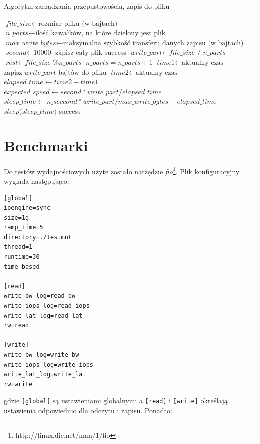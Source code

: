  \begin{algorithm}
 \caption{Algorytm zarządzania przepustowością, zapis do pliku}\label{writealg}
 \begin{algorithmic}[1]
  \STATE $\textit{file\_size} \gets \text{rozmiar pliku (w bajtach)}$
  \STATE $\textit{n\_parts} \gets \text{ilość kawałków, na które dzielony jest plik}$
  \STATE $\textit{max\_write\_bytes} \gets \text{maksymalna szybkość transferu danych zapisu (w bajtach)}$ 
  \STATE $\textit{second} \gets \textit{10000}$
    \STATE $\text{zapisz cały plik}$
    \RETURN success
  \ENDIF
  \STATE $\textit{write\_part} \gets \textit{file\_size / n\_parts}$
  \STATE $\textit{rest} \gets \textit{file\_size \% n\_parts}$
    \STATE $\textit{n\_parts} = \textit{n\_parts} + 1$
  \ENDIF
    \STATE $\textit{time1} \gets \text{aktualny czas}$
    \STATE $\text{zapisz } \textit{write\_part} \text{ bajtów do pliku}$
    \STATE $\textit{time2} \gets \text{aktualny czas}$
    \STATE $\textit{elapsed\_time} \gets \textit{time2} - \textit{time1}$
    \STATE $\textit{expected\_speed} \gets \textit{second} * \textit{write\_part} / \textit{elapsed\_time}$
    \STATE $\textit{sleep\_time} \gets \textit{n\_seccond} * \textit{write\_part} / \textit{max\_write\_bytes} - \textit{elapsed\_time}$
    \STATE $\textit{sleep(sleep\_time)}$
    \ENDIF
  \ENDFOR
  \RETURN success

 \end{algorithmic}
 \end{algorithm}

\clearpage
\section{Benchmarki}

Do testów wydajnościowych użyte zostało narzędzie \textit{fio}\footnote{http://linux.die.net/man/1/fio}.
Plik konfiguracyjny wygląda następująco:

\begin{verbatim}
[global]
ioengine=sync
size=1g
ramp_time=5
directory=./testmnt
thread=1
runtime=30
time_based

[read]
write_bw_log=read_bw
write_iops_log=read_iops
write_lat_log=read_lat
rw=read

[write]
write_bw_log=write_bw
write_iops_log=write_iops
write_lat_log=write_lat
rw=write
\end{verbatim}
gdzie \texttt{[global]} są ustawieniami globalnymi a \texttt{[read]} i \texttt{[write]} określają
ustawienia odpowiednio dla odczytu i zapisu. Ponadto:

